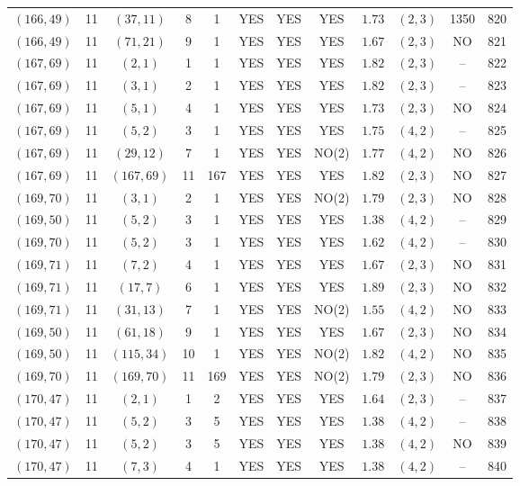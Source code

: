 \begin{longtable}{|c|c|c|c|c|c|c|c|c|c|c|c|}
$(166,49)$ & 11 & $(37,11)$ & 8 & 1 & YES & YES & YES & $1.73$ & $(2,3)$ & 1350 & 820\\
$(166,49)$ & 11 & $(71,21)$ & 9 & 1 & YES & YES & YES & $1.67$ & $(2,3)$ & NO & 821\\
$(167,69)$ & 11 & $(2,1)$ & 1 & 1 & YES & YES & YES & $1.82$ & $(2,3)$ & -- & 822\\
$(167,69)$ & 11 & $(3,1)$ & 2 & 1 & YES & YES & YES & $1.82$ & $(2,3)$ & -- & 823\\
$(167,69)$ & 11 & $(5,1)$ & 4 & 1 & YES & YES & YES & $1.73$ & $(2,3)$ & NO & 824\\
$(167,69)$ & 11 & $(5,2)$ & 3 & 1 & YES & YES & YES & $1.75$ & $(4,2)$ & -- & 825\\
$(167,69)$ & 11 & $(29,12)$ & 7 & 1 & YES & YES & NO(2) & $1.77$ & $(4,2)$ & NO & 826\\
$(167,69)$ & 11 & $(167,69)$ & 11 & 167 & YES & YES & YES & $1.82$ & $(2,3)$ & NO & 827\\
$(169,70)$ & 11 & $(3,1)$ & 2 & 1 & YES & YES & NO(2) & $1.79$ & $(2,3)$ & NO & 828\\
$(169,50)$ & 11 & $(5,2)$ & 3 & 1 & YES & YES & YES & $1.38$ & $(4,2)$ & -- & 829\\
$(169,70)$ & 11 & $(5,2)$ & 3 & 1 & YES & YES & YES & $1.62$ & $(4,2)$ & -- & 830\\
$(169,71)$ & 11 & $(7,2)$ & 4 & 1 & YES & YES & YES & $1.67$ & $(2,3)$ & NO & 831\\
$(169,71)$ & 11 & $(17,7)$ & 6 & 1 & YES & YES & YES & $1.89$ & $(2,3)$ & NO & 832\\
$(169,71)$ & 11 & $(31,13)$ & 7 & 1 & YES & YES & NO(2) & $1.55$ & $(4,2)$ & NO & 833\\
$(169,50)$ & 11 & $(61,18)$ & 9 & 1 & YES & YES & YES & $1.67$ & $(2,3)$ & NO & 834\\
$(169,50)$ & 11 & $(115,34)$ & 10 & 1 & YES & YES & NO(2) & $1.82$ & $(4,2)$ & NO & 835\\
$(169,70)$ & 11 & $(169,70)$ & 11 & 169 & YES & YES & NO(2) & $1.79$ & $(2,3)$ & NO & 836\\
$(170,47)$ & 11 & $(2,1)$ & 1 & 2 & YES & YES & YES & $1.64$ & $(2,3)$ & -- & 837\\
$(170,47)$ & 11 & $(5,2)$ & 3 & 5 & YES & YES & YES & $1.38$ & $(4,2)$ & -- & 838\\
$(170,47)$ & 11 & $(5,2)$ & 3 & 5 & YES & YES & YES & $1.38$ & $(4,2)$ & NO & 839\\
$(170,47)$ & 11 & $(7,3)$ & 4 & 1 & YES & YES & YES & $1.38$ & $(4,2)$ & -- & 840\\

\end{longtable}
